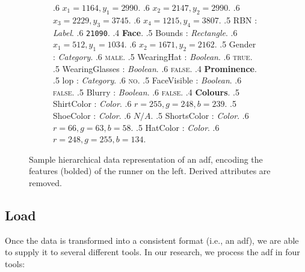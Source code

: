 \begin{figure}
\begin{subfigure}[b]{0.50\textwidth}
{      .6 $x_{1} = 1164, y_{1} = 2990$.
      .6 $x_{2} = 2147, y_{2} = 2990$.
      .6 $x_{3} = 2229, y_{3} = 3745$.
      .6 $x_{4} = 1215, y_{4} = 3807$.
      .5 RBN : \textit{Label}. 
      .6 \texttt{21090}.
      .4 \textbf{Face}.
      .5 Bounds : \textit{Rectangle}.    
      .6 $x_{1} = 512, y_{1} = 1034$.
      .6 $x_{2} = 1671, y_{2} = 2162$.
      .5 Gender : \textit{Category}.
      .6 \textsc{male}.
      .5 WearingHat : \textit{Boolean}.
      .6 \textsc{true}.
      .5 WearingGlasses : \textit{Boolean}.
      .6 \textsc{false}.
      .4 \textbf{Prominence}.
      .5 \gls{lop} : \textit{Category}.
      .6 \textsc{no}.
      .5 FaceVisible : \textit{Boolean}.
      .6 \textsc{false}.
      .5 Blurry : \textit{Boolean}.
      .6 \textsc{false}.
      .4 \textbf{Colours}.
      .5 ShirtColor : \textit{Color}.
      .6 $r = 255, g = 248, b = 239$.
      .5 ShoeColor : \textit{Color}.
      .6 $N/A$.
      .5 ShortsColor : \textit{Color}.
      .6 $r = 66, g = 63, b = 58$.
      .5 HatColor : \textit{Color}.
      .6 $r = 248, g = 255, b = 134$.
    }  
  \end{subfigure}
  \caption[Sample representation of an ADF]{Sample hierarchical data representation of an \gls{adf}, encoding the features (bolded) of the runner on the left. Derived attributes are removed.}
  \label{fig:dataset:adf_representation}
\end{figure}

\subsection{Load}
\label{sec:dataset:process:load}

Once the data is transformed into a consistent format (i.e., an \gls{adf}), we are able to supply it to several different tools. In our research, we process the \gls{adf} in four tools:

